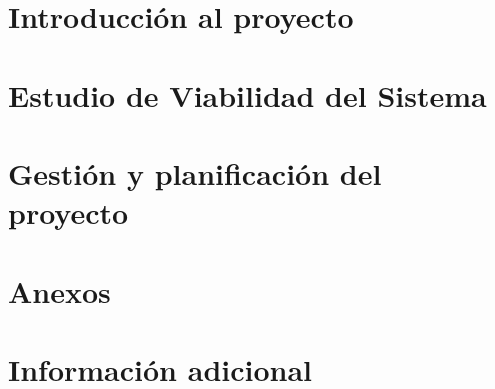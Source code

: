 \documentclass[10pt,a4paper,oldfontcommands]{plantillaDSIC}
\begin{document}
\pagecolor{fondo}
\color{principal}


\tableofcontents

\chapter{Introducción al proyecto}







\chapter{Estudio de Viabilidad del Sistema}







\chapter{Gestión y planificación del proyecto}




\chapter{Anexos}


\chapter{Información adicional}




% 
% 
\end{document}
